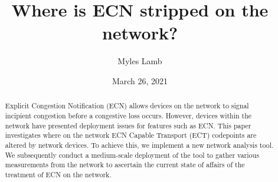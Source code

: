 \documentclass{l4proj}
\begin{document}
\title{Where is ECN stripped on the network?}
\author{Myles Lamb}
\date{March 26, 2021}

\maketitle

\begin{abstract}
    
 Explicit Congestion Notification (ECN) allows devices on the network to signal incipient congestion before a congestive loss occurs. However, devices within the network have presented deployment issues for features such as ECN. This paper investigates where on the network ECN Capable Transport (ECT) codepoints are altered by network devices. To achieve this, we implement a new network analysis tool. We subsequently conduct a medium-scale deployment of the tool to gather various measurements from the network to ascertain the current state of affairs of the treatment of ECN on the network. 
    
\end{abstract}


\def\consentname {Myles Lamb} %
\def\consentdate {26 March 2021} %

\educationalconsent


\tableofcontents

%
%
%
%
%
%
%
\end{document}
